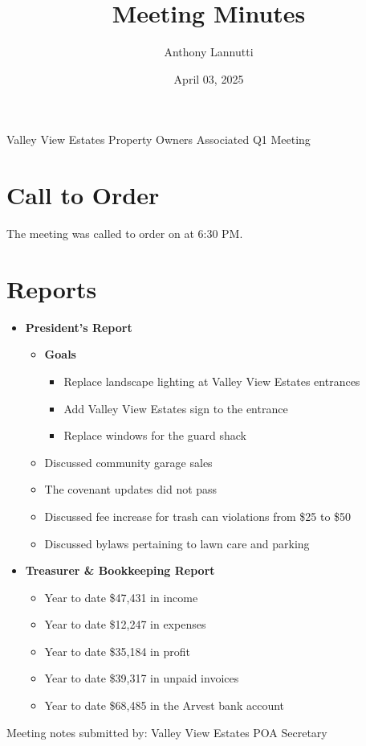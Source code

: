 \documentclass[12pt,a4paper]{article}
\author{Anthony Lannutti}
\date{April 03, 2025}
\title{Meeting Minutes}
\begin{document}
\begin{center}
  Valley View Estates Property Owners Associated Q1 Meeting\break{}
\end{center}

\section*{Call to Order}
\begin{flushleft}
The meeting was called to order on \@date{} at 6:30 PM\@.
\end{flushleft}


\section*{Reports}
\begin{itemize}
  \item \textbf{President's Report}
  \begin{itemize}
  \item \textbf{Goals}
    \begin{itemize}
    \item Replace landscape lighting at Valley View Estates entrances
    \item Add Valley View Estates sign to the entrance
    \item Replace windows for the guard shack
    \end{itemize}
  \item Discussed community garage sales
  \item The covenant updates did not pass
  \item Discussed fee increase for trash can violations from \$25 to \$50
  \item Discussed bylaws pertaining to lawn care and parking
  \end{itemize}
  \item \textbf{Treasurer \& Bookkeeping Report}
  \begin{itemize}
  \item Year to date \$47,431 in income
  \item Year to date \$12,247 in expenses
  \item Year to date \$35,184 in profit
  \item Year to date \$39,317 in unpaid invoices
  \item Year to date \$68,485 in the Arvest bank account
  \end{itemize}
\end{itemize}

\begin{flushleft}
Meeting notes submitted by:\break{}
\@author\break{}
Valley View Estates POA Secretary
\end{flushleft}
\end{document}
